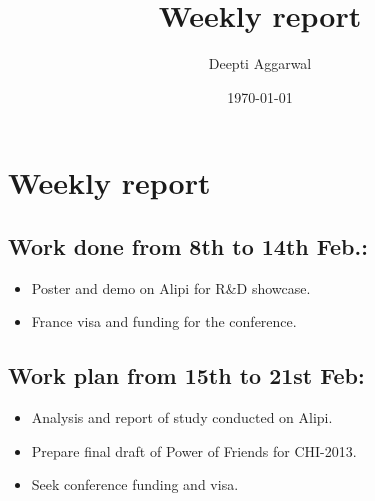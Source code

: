 \documentclass[11pt]{article}
\title{Weekly report}
\author{Deepti Aggarwal}
\date{\today}
\begin{document}
\maketitle

\setcounter{tocdepth}{3}
\vspace*{1cm}
\section{Weekly report}
\label{sec-1}

\subsection{Work done from 8th to 14th Feb.:}
\label{sec-1-2}
\begin{itemize}
\item Poster and demo on Alipi for R\&D showcase.
\item France visa and funding for the conference.
\end{itemize}

\subsection{Work plan from 15th to 21st Feb:}
\label{sec-1-1}
\begin{itemize}
\item Analysis and report of study conducted on Alipi.
\item Prepare final draft of Power of Friends for CHI-2013.
\item Seek conference funding and visa.
\end{itemize}
\end{document}
